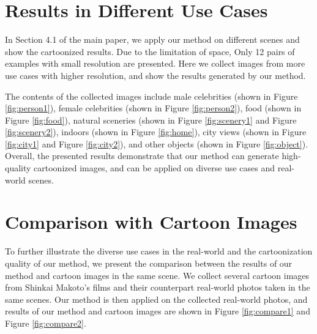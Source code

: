 \documentclass[10pt,twocolumn,letterpaper]{article}
\begin{document}
\section{Results in Different Use Cases}
In Section 4.1 of the main paper, we apply our method on different scenes and show the cartoonized results. Due to the limitation of space, Only 12 pairs of examples with small resolution are presented. Here we collect images from more use cases with higher resolution, and show the results generated by our method. 

The contents of the collected images include male celebrities (shown in Figure \ref{fig:person1}), female celebrities (shown in Figure \ref{fig:person2}), food (shown in Figure \ref{fig:food}), natural sceneries (shown in Figure \ref{fig:scenery1} and Figure \ref{fig:scenery2}), indoors (shown in Figure \ref{fig:home}), city views (shown in Figure \ref{fig:city1} and Figure \ref{fig:city2}), and other objects (shown in Figure \ref{fig:object}). Overall, the presented results demonstrate that our method can generate high-quality cartoonized images, and can be applied on diverse use cases and real-world scenes.

\section{Comparison with Cartoon Images}
To further illustrate the diverse use cases in the real-world and the cartoonization quality of our method, we present the comparison between the results of our method and cartoon images in the same scene. We collect several cartoon images from Shinkai Makoto's films and their counterpart real-world photos taken in the same scenes. Our method is then applied on the collected real-world photos, and results of our method and cartoon images are shown in Figure \ref{fig:compare1} and Figure \ref{fig:compare2}.
\end{document}
